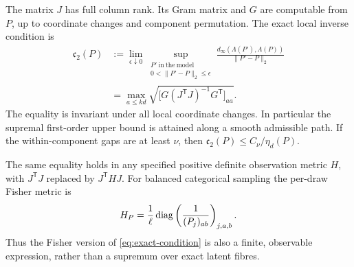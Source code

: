 \begin{theorem}\label{thm:exact-condition}
The matrix $J$ has full column rank. Its Gram matrix and $G$ are
computable from $P$, up to coordinate changes and component permutation.
The exact local inverse condition is
\begin{align}
 \mathfrak c_2(P)
 &:=\lim_{\epsilon\downarrow0}\sup_{\substack{P'\ \mathrm{in\ the\ model}\\
                      0<\|P'-P\|_2\le\epsilon}}
       \frac{d_\infty(\Lambda(P'),\Lambda(P))}{\|P'-P\|_2}\nonumber\\
 &=\max_{a\le kd}\sqrt{\big[G(J^{\mathsf T}J)^{-1}G^{\mathsf T}\big]_{aa}}.
                                                        \label{eq:exact-condition}
\end{align}
The equality is invariant under all local coordinate changes. In
particular the supremal first-order upper bound is attained along a
smooth admissible path. If the within-component gaps are at least
$\nu$, then $\mathfrak c_2(P)\le C_\nu/\eta_d(P)$.

The same equality holds in any specified positive definite observation
metric $H$, with $J^{\mathsf T}J$ replaced by $J^{\mathsf T}HJ$.
For balanced categorical sampling the per-draw Fisher metric is
\[
 H_P=\frac1\ell\operatorname{diag}\left(\frac1{(P_j)_{ab}}\right)_{j,a,b}.
\]
Thus the Fisher version of \eqref{eq:exact-condition} is also a finite,
observable expression, rather than a supremum over exact latent fibres.
\end{theorem}
